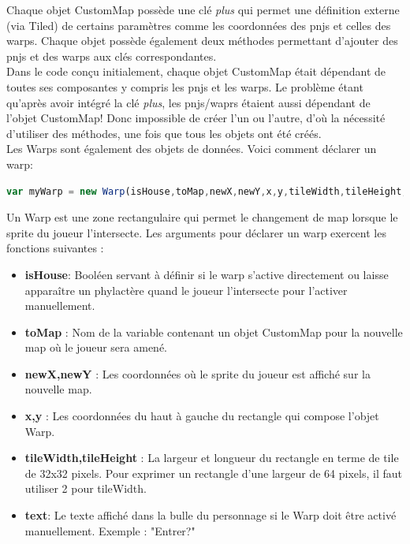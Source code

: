 \documentclass[11pt]{article}
\begin{document}
\begin{appendices}
Chaque objet CustomMap possède une clé \textit{plus} qui permet une définition externe (via Tiled) de certains paramètres comme les coordonnées des pnjs et celles des warps. Chaque objet possède également deux méthodes permettant d'ajouter des pnjs et des warps aux clés correspondantes.\\

Dans le code conçu initialement, chaque objet CustomMap était dépendant de toutes ses composantes y compris les pnjs et les warps. Le problème étant qu'après avoir intégré la clé \textit{plus}, les pnjs/waprs étaient aussi dépendant de l'objet CustomMap! Donc impossible de créer l'un ou l'autre, d'où la nécessité d'utiliser des méthodes, une fois que tous les objets ont été créés. \\ 


Les Warps sont également des objets de données. Voici comment déclarer un warp: 

\begin{lstlisting}[language=JavaScript]
var myWarp = new Warp(isHouse,toMap,newX,newY,x,y,tileWidth,tileHeight,text);
\end{lstlisting} 
Un Warp est une zone rectangulaire qui permet le changement de map lorsque le sprite du joueur l'intersecte. Les arguments pour déclarer un warp exercent les fonctions suivantes : 
\begin{itemize}
\item \textbf{isHouse}: Booléen servant à définir si le warp s'active directement ou laisse apparaître un phylactère quand le joueur l'intersecte pour l'activer manuellement.
\item \textbf{toMap} : Nom de la variable contenant un objet CustomMap pour la nouvelle map où le joueur sera amené.
\item \textbf{newX,newY} : Les coordonnées où le sprite du joueur est affiché sur la nouvelle map.
\item \textbf{x,y} : Les coordonnées du haut à gauche du rectangle qui compose l'objet Warp.
\item \textbf{tileWidth,tileHeight} : La largeur et longueur du rectangle en terme de tile de 32x32 pixels. Pour exprimer un rectangle d'une largeur de 64 pixels, il faut utiliser 2 pour tileWidth.
\item \textbf{text}: Le texte affiché dans la bulle du personnage si le Warp doit être activé manuellement. Exemple : "Entrer?"
\end{itemize}

\end{appendices}
\end{document}
